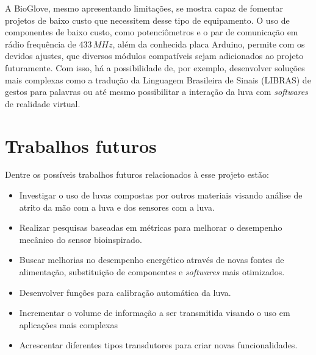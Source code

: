 \documentclass[
	12pt,				%
	openright,			%
	oneside,			%
	a4paper,			%
	english,			%
	brazil				%
	]{abntex2}
\begin{document}
		A BioGlove, mesmo apresentando limitações, se mostra capaz de fomentar projetos de baixo custo que necessitem desse tipo de equipamento. O uso de componentes de baixo custo, como potenciômetros e o par de comunicação em rádio frequência de 433$\,MHz$, além da conhecida placa Arduino, permite com os devidos ajustes, que diversos módulos compatíveis sejam adicionados ao projeto futuramente. Com isso, há a possibilidade de, por exemplo, desenvolver soluções mais complexas como a tradução da Linguagem Brasileira de Sinais (LIBRAS) de gestos para palavras ou até mesmo possibilitar a interação da luva com \textit{softwares} de realidade virtual.

			\section{Trabalhos futuros}		

		Dentre os possíveis trabalhos futuros relacionados à esse projeto estão:

		\begin{itemize}
			\item Investigar o uso de luvas compostas por outros materiais visando análise de atrito da mão com a luva e dos sensores com a luva.
			\item Realizar pesquisas baseadas em métricas para melhorar o desempenho mecânico do sensor bioinspirado.
			\item Buscar melhorias no desempenho energético através de novas fontes de alimentação, substituição de componentes e \textit{softwares} mais otimizados.
			\item Desenvolver funções para calibração automática da luva.
			\item Incrementar o volume de informação a ser transmitida visando o uso em aplicações mais complexas
			\item Acrescentar diferentes tipos transdutores para criar novas funcionalidades.
		\end{itemize}

		
\postextual



\printindex
\end{document}
